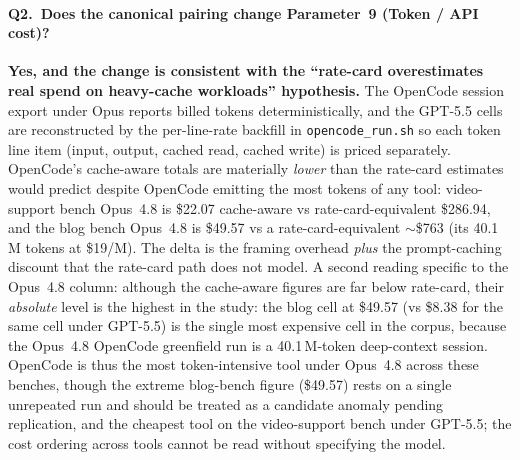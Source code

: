 \paragraph{Q2.\ Does the canonical pairing change Parameter~9 (Token
/ API cost)?} \textbf{Yes, and the change is consistent with the
``rate-card overestimates real spend on heavy-cache workloads''
hypothesis.} The OpenCode session export under Opus reports billed
tokens deterministically, and the GPT-5.5 cells are reconstructed by
the per-line-rate backfill in \texttt{opencode\_run.sh} so each token
line item (input, output, cached read, cached write) is priced
separately. OpenCode's cache-aware totals are materially
\emph{lower} than the rate-card estimates would predict despite
OpenCode emitting the most tokens of any tool: video-support bench Opus~4.8
is \$22.07 cache-aware vs rate-card-equivalent \$286.94, and the
blog bench Opus~4.8 is \$49.57 vs a rate-card-equivalent
$\sim$\$763 (its 40.1\,M tokens at \$19/M). The delta is the framing
overhead \emph{plus} the prompt-caching discount that the rate-card
path does not model. A second reading specific to the Opus~4.8 column:
although the cache-aware figures are far below rate-card, their
\emph{absolute} level is the highest in the study: the blog
cell at \$49.57 (vs \$8.38 for the same cell under GPT-5.5) is the
single most expensive cell in the corpus, because the Opus~4.8
OpenCode greenfield run is a 40.1\,M-token deep-context session.
OpenCode is thus the most token-intensive tool under Opus~4.8 across
these benches, though the extreme blog-bench figure (\$49.57) rests on
a single unrepeated run and should be treated as a candidate anomaly
pending replication, and the cheapest tool on the video-support bench
under GPT-5.5; the cost ordering across tools cannot be read without
specifying the model.

